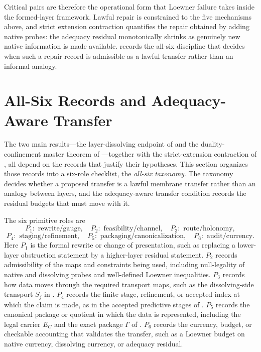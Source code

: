 \documentclass[11pt]{article}
\theoremstyle{definition}
\begin{document}
Critical pairs are therefore the operational form that Loewner failure
takes inside the formed-layer framework.  Lawful repair is constrained
to the five mechanisms above, and strict extension contraction
quantifies the repair obtained by adding native probes: the adequacy
residual monotonically shrinks as genuinely new native information is
made available.   records the all-six discipline
that decides when such a repair record is admissible as a lawful
transfer rather than an informal analogy.

 

\section{All-Six Records and Adequacy-Aware Transfer}
\label{sec:taxonomy}

The two main results---the layer-dissolving endpoint of
 and the duality-confinement master theorem of
---together with the strict-extension
contraction of , all depend on the records
that justify their hypotheses.  This section organizes those records
into a six-role checklist, the \emph{all-six taxonomy}.  The taxonomy
decides whether a proposed transfer is a lawful membrane transfer
rather than an analogy between layers, and the adequacy-aware transfer
condition records the residual budgets that must move with it.

The six primitive roles are
\[
  P_1:\text{ rewrite/gauge},\quad
  P_2:\text{ feasibility/channel},\quad
  P_3:\text{ route/holonomy},
\]
\[
  P_4:\text{ staging/refinement},\quad
  P_5:\text{ packaging/canonicalization},\quad
  P_6:\text{ audit/currency}.
\]
Here \(P_1\) is the formal rewrite or change of presentation, such as
replacing a lower-layer obstruction statement by a higher-layer
residual statement.  \(P_2\) records admissibility of the maps and
constraints being used, including null-legality of native and dissolving
probes and well-defined Loewner inequalities.  \(P_3\) records how data
moves through the required transport maps, such as the dissolving-side
transport \(S_j\) in .  \(P_4\) records the finite
stage, refinement, or accepted index at which the claim is made, as in
the accepted predictive stages of .
\(P_5\) records the canonical package or quotient in which the data is
represented, including the legal carrier \(E_C\) and the exact package
\(\Gamma\) of .  \(P_6\) records the currency,
budget, or checkable accounting that validates the transfer, such as a
Loewner budget on native currency, dissolving currency, or adequacy
residual.
\end{document}
